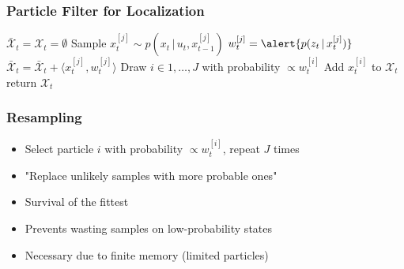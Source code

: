 \begin{frame} 
    \frametitle{Particle Filter for Localization} 
    
    \begin{algorithmic}[1] 
        \State $\bar{\mathcal{X}}_t = \mathcal{X}_t = \emptyset$ 
        \State Sample \alert{$x_t^{[j]} \sim p(x_t \, | \, u_t, x_{t-1}^{[j]})$} 
        \State $w_t^{[j]} = \alert{p(z_t \, | \, x_t^{[j]})}$ 
        \State $\bar{\mathcal{X}}_t = \bar{\mathcal{X}}_t + \langle x_t^{[j]}, w_t^{[j]}\rangle$ 
        \EndFor 
        \State Draw $i \in 1,\ldots,J$ with probability $\propto w_t^{[i]}$ 
        \State Add $x_t^{[i]}$ to $\mathcal{X}_t$ 
        \EndFor 
        \State return $\mathcal{X}_t$ 
        \EndProcedure 
    \end{algorithmic}
\end{frame}

\begin{frame}
    \frametitle{Resampling}

    \begin{itemize}
        \item Select particle $i$ with probability $\propto w_t^{[i]}$, repeat $J$ times
        \item "Replace unlikely samples with more probable ones"
        \item Survival of the fittest
        \item Prevents wasting samples on low-probability states
        \item Necessary due to finite memory (limited particles)
    \end{itemize}
\end{frame}

